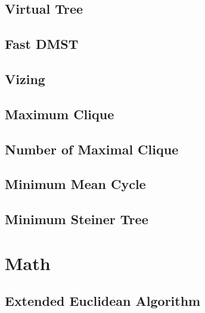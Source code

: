 \documentclass{article}
\begin{document}
\subsection{Virtual Tree}


%

\subsection{Fast DMST}


\subsection{Vizing}


\subsection{Maximum Clique}


\subsection{Number of Maximal Clique}


\subsection{Minimum Mean Cycle}


\subsection{Minimum Steiner Tree}


\section{Math}

\subsection{Extended Euclidean Algorithm}

\end{document}
